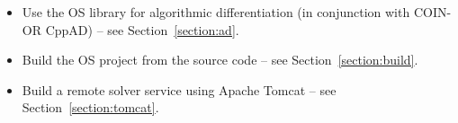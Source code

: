 \begin{itemize}
\item Use the OS library for algorithmic differentiation (in conjunction with 
COIN-OR CppAD) -- see Section~\ref{section:ad}.

\item Build the OS project from the source code -- see Section~\ref{section:build}.

\item Build a remote solver service using Apache Tomcat -- see Section~\ref{section:tomcat}.
\fi
\end{itemize}

